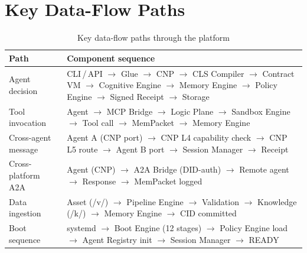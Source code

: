 \section{Key Data-Flow Paths}

\begin{table}[H]
\centering
\renewcommand{\arraystretch}{1.45}
\begin{tabularx}{\textwidth}{@{}lX@{}}
\toprule
\textbf{Path} & \textbf{Component sequence} \\
\midrule
Agent decision & CLI\,/\,API $\to$ Glue $\to$ CNP $\to$ CLS Compiler $\to$ Contract VM $\to$ Cognitive Engine $\to$ Memory Engine $\to$ Policy Engine $\to$ Signed Receipt $\to$ Storage \\
Tool invocation & Agent $\to$ MCP Bridge $\to$ Logic Plane $\to$ Sandbox Engine $\to$ Tool call $\to$ MemPacket $\to$ Memory Engine \\
Cross-agent message & Agent A (CNP port) $\to$ CNP L4 capability check $\to$ CNP L5 route $\to$ Agent B port $\to$ Session Manager $\to$ Receipt \\
Cross-platform A2A & Agent (CNP) $\to$ A2A Bridge (DID-auth) $\to$ Remote agent $\to$ Response $\to$ MemPacket logged \\
Data ingestion & Asset (/v/) $\to$ Pipeline Engine $\to$ Validation $\to$ Knowledge (/k/) $\to$ Memory Engine $\to$ CID committed \\
Boot sequence & systemd $\to$ Boot Engine (12 stages) $\to$ Policy Engine load $\to$ Agent Registry init $\to$ Session Manager $\to$ READY \\
\bottomrule
\end{tabularx}
\caption{Key data-flow paths through the platform}
\end{table}
